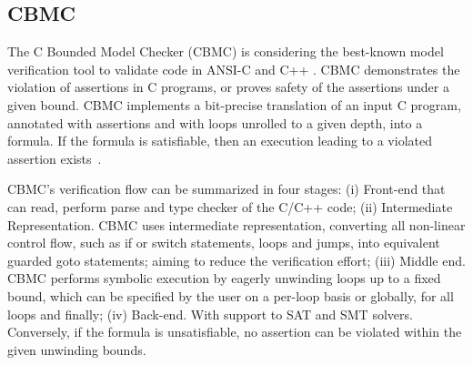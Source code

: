 \documentclass[runningheads]{llncs}
\begin{document}
\subsection{CBMC}
The C Bounded Model Checker (CBMC) is considering the best-known model verification tool to validate code in ANSI-C and C++ \cite{Kroening}. CBMC demonstrates the violation of assertions in C programs, or proves safety of the assertions under a given bound.
CBMC implements a bit-precise translation of an input C program, annotated
with assertions and with loops unrolled to a given depth, into a formula. If the
formula is satisfiable, then an execution leading to a violated assertion exists~\cite{Kroening}.

CBMC's verification flow can be summarized in four stages: (i) Front-end that can read, perform parse and type checker of the C/C++ code; (ii) Intermediate Representation. CBMC uses  intermediate representation, converting all non-linear control flow, such as if or switch statements, loops and jumps, into equivalent guarded goto statements; aiming to reduce the verification effort; (iii) Middle end. CBMC performs symbolic execution by eagerly unwinding loops up to a fixed bound, which can be specified by the user on a per-loop basis or globally, for all loops and finally; (iv) Back-end. With support to SAT and SMT solvers. Conversely, if the formula is unsatisfiable, no assertion can be violated within the given unwinding bounds.
\end{document}

